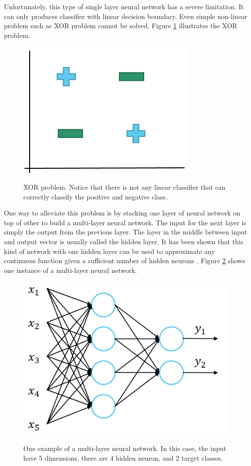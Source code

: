 \documentclass[a4paper,11pt]{kth-mag}
\begin{document}
Unfortunately, this type of single layer neural network has a severe limitation. It can only produces classifier with linear decision boundary. Even simple non-linear problem such as XOR problem cannot be solved. Figure \ref{fig:xor} illustrates the XOR problem.
\begin{figure}[h]
\centering
\includegraphics[scale=0.5]{image/xor.png}
\label{fig:xor}
\caption{XOR problem. Notice that there is not any linear classifier that can correctly classify the positive and negative class.}
\end{figure}

One way to alleviate this problem is by stacking one layer of neural network on top of other to build a multi-layer neural network. The input for the next layer is simply the output from the previous layer. The layer in the middle between input and output vector is usually called the hidden layer. It has been shown that this kind of network with one hidden layer can be used to approximate any continuous function given a sufficient number of hidden neurons \cite{cybenko1989}. Figure \ref{fig:multilayer} shows one instance of a multi-layer neural network.

\begin{figure}[h]
\centering
\includegraphics[scale=0.4]{image/multilayer.png}
\label{fig:multilayer}
\caption{One example of a multi-layer neural network. In this case, the input have 5 dimensions, there are 4 hidden neuron, and 2 target classes.}
\end{figure}
\end{document}
